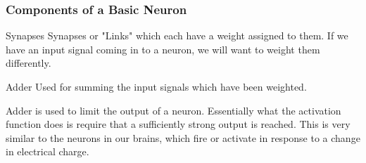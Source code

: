 \documentclass{beamer}
\begin{document}
\begin{frame}
\frametitle{Components of a Basic Neuron}
\begin{block}{Synapses}
Synapses or "Links" which each have a weight assigned to them. If we have an input signal coming in to a neuron, we will want to weight them differently.
\end{block}
\begin{block}{Adder}
Used for summing the input signals which have been weighted. 
\end{block}

\begin{block}{Adder}
is used to limit the output of a neuron. Essentially what the activation function does is require that a sufficiently strong output is reached. This is very similar to the neurons in our brains, which fire or activate in response to a change in electrical charge.
\end{block}

\end{frame}
\end{document}
